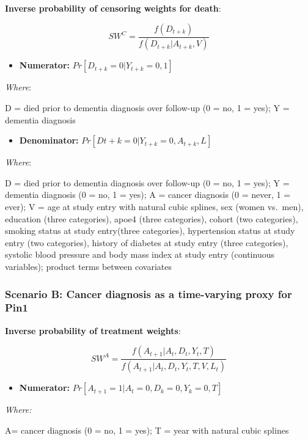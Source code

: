 \documentclass[
]{book}
\providecommand{\tightlist}{%
  \setlength{\itemsep}{0pt}\setlength{\parskip}{0pt}}
\begin{document}
\textbf{Inverse probability of censoring weights for death}:

\[SW^C = \frac{f(D_{t+k})}{f(D_{t+k}|A_{t+k},V)}\]

\begin{itemize}
\tightlist
\item
  \textbf{Numerator:} \(Pr[D_{t+k} = 0|Y_{t+k} = 0, 1]\)
\end{itemize}

\emph{Where}:

D = died prior to dementia diagnosis over follow-up (0 = no, 1 = yes); Y = dementia diagnosis

\begin{itemize}
\tightlist
\item
  \textbf{Denominator:} \(Pr[D{t+k} = 0|Y_{t+k} = 0, A_{t+k},L]\)
\end{itemize}

\emph{Where}:

D = died prior to dementia diagnosis over follow-up (0 = no, 1 = yes); Y = dementia diagnosis (0 = no, 1 = yes); A = cancer diagnosis (0 = never, 1 = ever); V = age at study entry with natural cubic splines, sex (women vs.~men), education (three categories), apoe4 (three categories), cohort (two categories), smoking status at study entry(three categories), hypertension status at study entry (two categories), history of diabetes at study entry (three categories), systolic blood pressure and body mass index at study entry (continuous variables); product terms between covariates

\hypertarget{scenario-b-cancer-diagnosis-as-a-time-varying-proxy-for-pin1}{%
\subsubsection{Scenario B: Cancer diagnosis as a time-varying proxy for Pin1}\label{scenario-b-cancer-diagnosis-as-a-time-varying-proxy-for-pin1}}

\textbf{Inverse probability of treatment weights}:

\[SW^A = \frac{f(A_{t+1}|A_t, D_t, Y_t, T)}{f(A_{t+1}|A_t, D_t, Y_t, T, V, L_t)}\]

\begin{itemize}
\tightlist
\item
  \textbf{Numerator:} \(Pr[A_{t+1} = 1| A_t = 0, D_k = 0, Y_k = 0, T]\)
\end{itemize}

\emph{Where:}

A= cancer diagnosis (0 = no, 1 = yes); T = year with natural cubic splines
\end{document}

